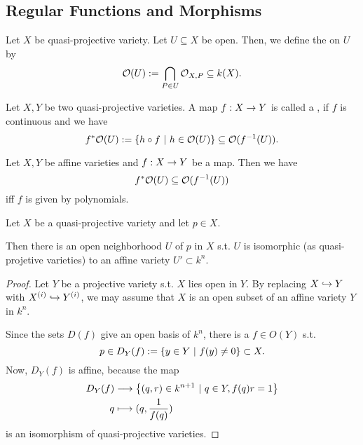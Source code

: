\subsection{Regular Functions and Morphisms}
\begin{definition}
	Let $X$ be quasi-projective variety. Let $U \subseteq X$ be open. Then, we define the  on $U$ by
	\[ \mathcal{O}(U) := \bigcap_{P \in U}\mathcal{O}_{X,P} \subseteq k(X). \]
\end{definition}

\begin{definition}
	Let $X,Y$ be two quasi-projective varieties. A map $f:X\overset{}{\rightarrow} Y$ is called a , if $f$ is continuous and we have
	\[ f^*\mathcal{O}(U) := \left\lbrace h \circ f ~ | ~ h \in \mathcal{O}(U)\right\rbrace \subseteq \mathcal{O}(f^{-1}(U)). \]
\end{definition}
\begin{remark}
	Let $X,Y$ be affine varieties and $f : X \overset{}{\rightarrow} Y$ be a map. Then we have
	\[ f^*\mathcal{O}(U) \subseteq \mathcal{O}(f^{-1}(U)) \]
	iff $f$ is given by polynomials.
\end{remark}

\begin{lemma}
	Let $X$ be a quasi-projective variety and let $p \in X$.
	
	Then there is an open neighborhood $U$ of $p$ in $X$ s.t. $U$ is isomorphic (as quasi-projetive varieties) to an affine variety $U' \subset k^n$.
\end{lemma}
\begin{proof}
	Let $Y$ be a projective variety s.t. $X$ lies open in $Y$. By replacing $X \overset{}{\hookrightarrow} Y$ with $X^{(i)}\overset{}{\hookrightarrow} Y^{(i)}$, we may assume that $X$ is an open subset of an affine variety $Y$ in $k^n$.
	
	Since the sets $D(f)$ give an open basis of $k^n$, there is a $f \in O(Y)$ s.t.
	\[ p \in D_Y(f) := \left\lbrace y \in Y ~ | ~ f(y) \neq 0\right\rbrace \subset X. \]
	Now, $D_Y(f)$ is affine, because the map
	\begin{align*}
	D_Y(f) & \overset{}{\longrightarrow} \left\lbrace(q,r) \in k^{n+1} ~ | ~ q \in Y, f(q) r = 1\right\rbrace\\
	q &\longmapsto (q, \frac{1}{f(q)})
	\end{align*}
is an isomorphism of quasi-projective varieties.
\end{proof}